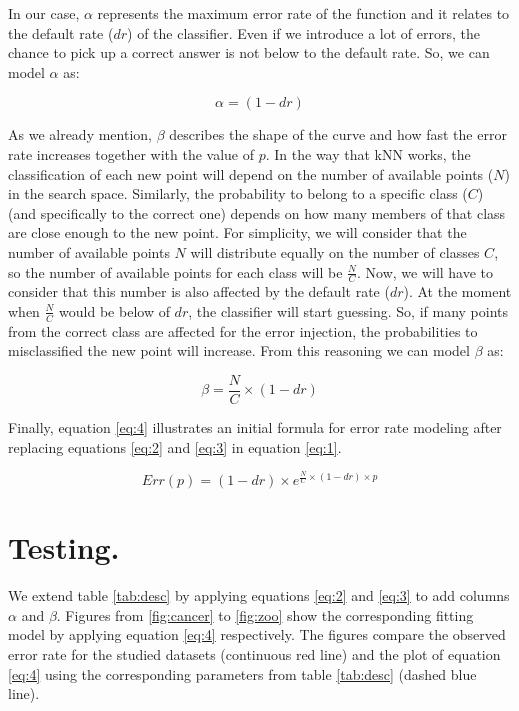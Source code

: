 \documentclass{article}
\begin{document}
In our case, $\alpha$ represents the maximum error rate of the function and it relates to the default rate ($dr$) of the classifier.  Even if we introduce a lot of errors, the chance to pick up a correct answer is not below to the default rate.  So, we can model $\alpha$ as: 

\begin{equation}\label{eq:2}
  \alpha = (1-dr)
\end{equation}

As we already mention, $\beta$ describes the shape of the curve and how fast the error rate increases together with the value of $p$. In the way that kNN works, the classification of each new point will depend on the number of available points ($N$) in the search space.  Similarly, the probability to belong to a specific class ($C$) (and specifically to the correct one) depends on how many members of that class are close enough to the new point. For simplicity, we will consider that the number of available points $N$ will distribute equally on the number of classes $C$, so the number of available points for each class will be $\frac{N}{C}$.  Now, we will have to consider that this number is also affected by the default rate ($dr$).  At the moment when $\frac{N}{C}$ would be below of $dr$, the classifier will start guessing. So, if many points from the correct class are affected for the error injection, the probabilities to misclassified the new point will increase.  From this reasoning we can model $\beta$ as: 

\begin{equation}\label{eq:3}
  \beta = \frac{N}{C} \times (1-dr)
\end{equation}

Finally, equation \ref{eq:4} illustrates an initial formula for error rate modeling after replacing equations \ref{eq:2} and \ref{eq:3} in equation \ref{eq:1}.

\begin{equation}\label{eq:4}
  Err(p)=(1-dr) \times e^{\frac{N}{C} \times (1-dr) \times p}
\end{equation}


\section{Testing.}

We extend table \ref{tab:desc} by applying equations \ref{eq:2} and \ref{eq:3} to add columns $\alpha$ and $\beta$.  Figures from \ref{fig:cancer} to \ref{fig:zoo} show the corresponding fitting model by applying equation \ref{eq:4} respectively.  The figures compare the observed error rate for the studied datasets (continuous red line) and the plot of equation \ref{eq:4} using the corresponding parameters from table \ref{tab:desc} (dashed blue line).
\end{document}
